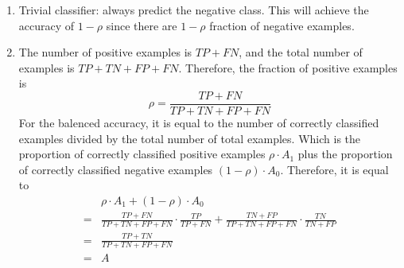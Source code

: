 \begin{answer}
    \begin{enumerate}
        \item Trivial classifier: always predict the negative class. This will achieve the accuracy of $1-\rho$ since there are $1 - \rho$ fraction of negative examples.
        \item The number of positive examples is $TP + FN$, and the total number of examples is $TP + TN + FP + FN$. Therefore, the fraction of positive examples is
            $$
                \rho = \frac{TP + FN}{TP + TN + FP + FN}
            $$
            For the balenced accuracy, it is equal to the number of correctly classified examples divided by the total number of total examples.
            Which is the proportion of correctly classified positive examples $\rho \cdot A_1$ plus the proportion of correctly classified negative examples $(1 - \rho) \cdot A_0$.
            Therefore, it is equal to
            \begin{align*}
                    &\rho \cdot A_1 + (1 - \rho) \cdot A_0 \\
                  = &\frac{TP + FN}{TP + TN + FP + FN} \cdot \frac{TP}{TP + FN} + \frac{TN + FP}{TP + TN + FP + FN} \cdot \frac{TN}{TN + FP} \\
                  = &\frac{TP + TN}{TP + TN + FP + FN} \\
                  = &A
            \end{align*}
    \end{enumerate}
\end{answer}